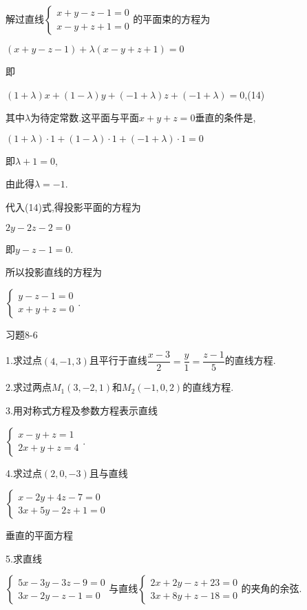 \documentclass[oneside]{book}
\begin{document}
解过直线$\left\{\begin{array}{l}{x+y-z-1=0} \\ {x-y+z+1=0}\end{array}\right.$的平面束的方程为

$(x + y - z - 1) + \lambda (x - y + z + 1) = 0$

即

$(1 + \lambda )x + (1 - \lambda )y + ( - 1 + \lambda )z + ( - 1 + \lambda ) = 0$,(14)

其中$\lambda $为待定常数.这平面与平面$x + y + z = 0$垂直的条件是,

$(1 + \lambda ) \cdot 1 + (1 - \lambda ) \cdot 1 + ( - 1 + \lambda ) \cdot 1 = 0$

即$\lambda  + 1 = 0$,

由此得$\lambda  =  - 1$.

代入(14)式,得投影平面的方程为

$2y - 2z - 2 = 0$

即$y - z - 1 = 0$.

所以投影直线的方程为

$\left\{\begin{array}{l}{y-z-1=0} \\ {x+y+z=0}\end{array}\right.$.

习题8-6

1.求过点$(4,-1,3)$且平行于直线$\dfrac{{x - 3}}{2} = \dfrac{y}{1} = \dfrac{{z - 1}}{5}$的直线方程.

2.求过两点${M_1}(3, - 2,1)$和${M_2}( - 1,0,2)$的直线方程.

3.用对称式方程及参数方程表示直线

$\left\{\begin{array}{l}{x-y+z=1} \\ {2 x+y+z=4}\end{array}\right.$.

4.求过点$(2,0,-3)$且与直线

$\left\{\begin{array}{l}{x-2 y+4 z-7=0} \\ {3 x+5 y-2 z+1=0}\end{array}\right.$


垂直的平面方程

5.求直线

$\left\{\begin{array}{l}{5 x-3 y-3 z-9=0} \\ {3 x-2 y-z-1=0}\end{array}\right.$与直线$\left\{\begin{array}{l}{2 x+2 y-z+23=0} \\ {3 x+8 y+z-18=0}\end{array}\right.$的夹角的余弦.
\end{document}
